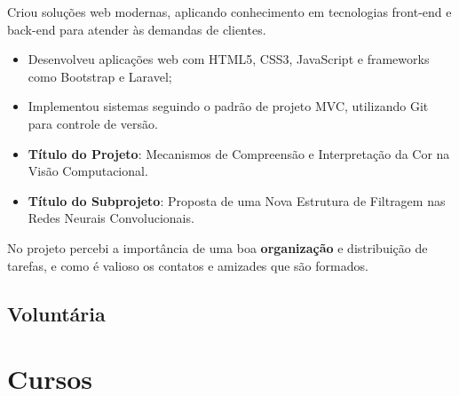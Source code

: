 \documentclass[10pt, a4paper, roman]{moderncv} %
\begin{document}
\vspace{0.4cm}
{
    Criou soluções web modernas, aplicando conhecimento em tecnologias front-end e back-end para atender às demandas de clientes.\\
    \begin{itemize}
      \item Desenvolveu aplicações web com HTML5, CSS3, JavaScript e frameworks como Bootstrap e Laravel;
      \item Implementou sistemas seguindo o padrão de projeto MVC, utilizando Git para controle de versão.
    \end{itemize}
}





\vspace{0.2cm}
{
	\begin{itemize}
		\item \textbf{Título do Projeto}: Mecanismos de Compreensão e Interpretação da Cor na Visão Computacional.
		\item \textbf{Título do Subprojeto}: Proposta de uma Nova Estrutura de Filtragem nas Redes Neurais Convolucionais.
	\end{itemize}
  No projeto percebi a importância de uma boa \textbf{organização} e distribuição de tarefas, e como é valioso os contatos e amizades que são formados.
}


\vspace{0.2cm}


\subsection{Voluntária}

\vspace{0.2cm}

\vspace{0.5cm}
\section{Cursos}

\end{document}
